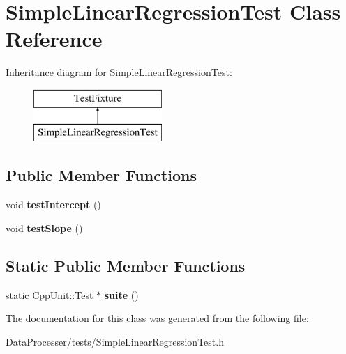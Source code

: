 \hypertarget{classSimpleLinearRegressionTest}{}\section{Simple\+Linear\+Regression\+Test Class Reference}
\label{classSimpleLinearRegressionTest}
Inheritance diagram for Simple\+Linear\+Regression\+Test\+:\begin{figure}[H]
\begin{center}
\leavevmode
\includegraphics[height=2.000000cm]{classSimpleLinearRegressionTest}
\end{center}
\end{figure}
\subsection*{Public Member Functions}
\begin{DoxyCompactItemize}
\item 
\mbox{\label{classSimpleLinearRegressionTest_a4330926babb43ab5e40c66902a8401c5}} 
void {\bfseries test\+Intercept} ()
\item 
\mbox{\label{classSimpleLinearRegressionTest_a9de5a17b46e2a0370366698fe63e7c6a}} 
void {\bfseries test\+Slope} ()
\end{DoxyCompactItemize}
\subsection*{Static Public Member Functions}
\begin{DoxyCompactItemize}
\item 
\mbox{\label{classSimpleLinearRegressionTest_a82b98fdff3711e204b8f7b47723c43a0}} 
static Cpp\+Unit\+::\+Test $\ast$ {\bfseries suite} ()
\end{DoxyCompactItemize}


The documentation for this class was generated from the following file\+:\begin{DoxyCompactItemize}
\item 
Data\+Processer/tests/Simple\+Linear\+Regression\+Test.\+h\end{DoxyCompactItemize}
